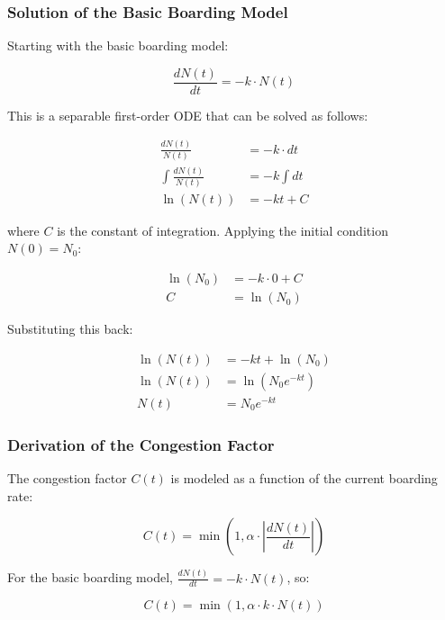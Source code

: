 \subsubsection{Solution of the Basic Boarding Model}

Starting with the basic boarding model:

\begin{equation}
\frac{dN(t)}{dt} = -k \cdot N(t)
\end{equation}

This is a separable first-order ODE that can be solved as follows:

\begin{align}
\frac{dN(t)}{N(t)} &= -k \cdot dt \\
\int \frac{dN(t)}{N(t)} &= -k \int dt \\
\ln(N(t)) &= -kt + C
\end{align}

where $C$ is the constant of integration. Applying the initial condition $N(0) = N_0$:

\begin{align}
\ln(N_0) &= -k \cdot 0 + C \\
C &= \ln(N_0)
\end{align}

Substituting this back:

\begin{align}
\ln(N(t)) &= -kt + \ln(N_0) \\
\ln(N(t)) &= \ln(N_0 e^{-kt}) \\
N(t) &= N_0 e^{-kt}
\end{align}

\subsubsection{Derivation of the Congestion Factor}

The congestion factor $C(t)$ is modeled as a function of the current boarding rate:

\begin{equation}
C(t) = \min\left(1, \alpha \cdot \left| \frac{dN(t)}{dt} \right| \right)
\end{equation}

For the basic boarding model, $\frac{dN(t)}{dt} = -k \cdot N(t)$, so:

\begin{equation}
C(t) = \min\left(1, \alpha \cdot k \cdot N(t) \right)
\end{equation}

